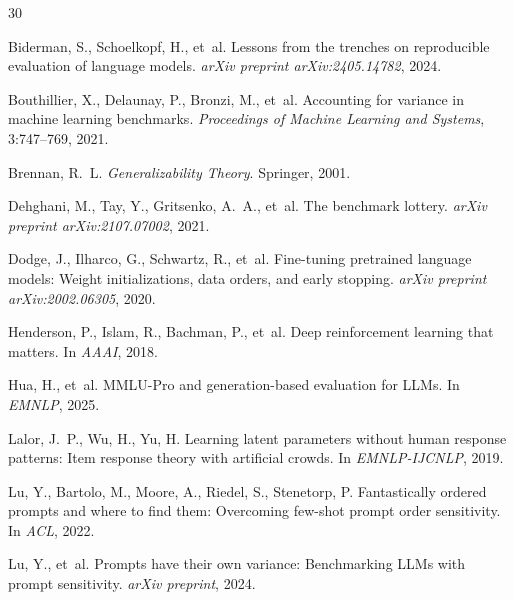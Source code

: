 \documentclass[letterpaper]{article}
\begin{document}

\begin{thebibliography}{30}

Biderman, S., Schoelkopf, H., et~al.
\newblock Lessons from the trenches on reproducible evaluation of language models.
\newblock \emph{arXiv preprint arXiv:2405.14782}, 2024.

Bouthillier, X., Delaunay, P., Bronzi, M., et~al.
\newblock Accounting for variance in machine learning benchmarks.
\newblock \emph{Proceedings of Machine Learning and Systems}, 3:747--769, 2021.

Brennan, R.~L.
\newblock \emph{Generalizability Theory}.
\newblock Springer, 2001.

Dehghani, M., Tay, Y., Gritsenko, A.~A., et~al.
\newblock The benchmark lottery.
\newblock \emph{arXiv preprint arXiv:2107.07002}, 2021.

Dodge, J., Ilharco, G., Schwartz, R., et~al.
\newblock Fine-tuning pretrained language models: Weight initializations, data orders, and early stopping.
\newblock \emph{arXiv preprint arXiv:2002.06305}, 2020.

Henderson, P., Islam, R., Bachman, P., et~al.
\newblock Deep reinforcement learning that matters.
\newblock In \emph{AAAI}, 2018.

Hua, H., et~al.
\newblock MMLU-Pro and generation-based evaluation for LLMs.
\newblock In \emph{EMNLP}, 2025.

Lalor, J.~P., Wu, H., Yu, H.
\newblock Learning latent parameters without human response patterns: Item response theory with artificial crowds.
\newblock In \emph{EMNLP-IJCNLP}, 2019.

Lu, Y., Bartolo, M., Moore, A., Riedel, S., Stenetorp, P.
\newblock Fantastically ordered prompts and where to find them: Overcoming few-shot prompt order sensitivity.
\newblock In \emph{ACL}, 2022.

Lu, Y., et~al.
\newblock Prompts have their own variance: Benchmarking LLMs with prompt sensitivity.
\newblock \emph{arXiv preprint}, 2024.


\end{thebibliography}
\end{document}
